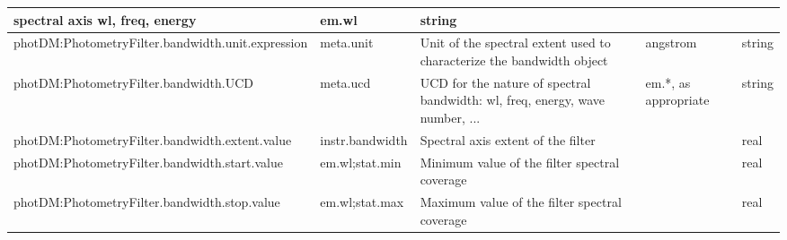 \documentclass[11pt,a4paper]{ivoa}
\begin{document}
\begin{appendices}
\begin{table}[H]
\begin{adjustbox}{angle=90}
\begin{tabular}{p{5in}p{0.87in}p{2in}p{0.4in}p{0.25in}}
{{spectral axis wl, freq, energy}} &
\multicolumn{1}{p{0.74in}}{{\fontsize{8pt}{8pt}\selectfont em.wl}} &
\multicolumn{1}{p{0.35in}}{{\fontsize{8pt}{8pt}\selectfont string}} \\
\hline
\multicolumn{1}{p{5in}}{{\fontsize{8pt}{8pt}
\selectfont photDM:PhotometryFilter.bandwidth.unit.expression}} &
\multicolumn{1}{p{0.87in}}{{\fontsize{8pt}{8pt}\selectfont meta.unit}} &
\multicolumn{1}{p{2in}}{{\fontsize{8pt}{8pt}\selectfont Unit of the spectral extent 
used to characterize the bandwidth object}} &
\multicolumn{1}{p{0.74in}}{{\fontsize{10pt}{12.0pt}\selectfont angstrom}} &
\multicolumn{1}{p{0.35in}}{{\fontsize{8pt}{8pt}\selectfont string}} \\
\hline
\multicolumn{1}{p{5in}}{
{\fontsize{8pt}{8pt}\selectfont photDM:PhotometryFilter.bandwidth.UCD}} &
\multicolumn{1}{p{0.87in}}{{\fontsize{8pt}{8pt}\selectfont meta.ucd }} &
\multicolumn{1}{p{2in}}{{\fontsize{8pt}{8pt}\selectfont UCD for the nature of 
spectral bandwidth: wl, freq, energy, wave number, ...}} &
\multicolumn{1}{p{0.74in}}{{\fontsize{8pt}{8pt}\selectfont em.*, as appropriate}} &
\multicolumn{1}{p{0.35in}}{{\fontsize{8pt}{8pt}\selectfont string}} \\
\hline
\multicolumn{1}{p{5in}}{{\fontsize{8pt}{8pt}
\selectfont photDM:PhotometryFilter.bandwidth.extent.value}} &
\multicolumn{1}{p{0.87in}}{{\fontsize{8pt}{8pt}\selectfont instr.bandwidth}} &
\multicolumn{1}{p{2in}}{{\fontsize{8pt}{8pt}\selectfont Spectral axis extent of the filter}} &
\multicolumn{1}{p{0.74in}}{} &
\multicolumn{1}{p{0.35in}}{{\fontsize{8pt}{8pt}\selectfont real}} \\
\hline
\multicolumn{1}{p{5in}}{{\fontsize{8pt}{8pt}
\selectfont photDM:PhotometryFilter.bandwidth.start.value}} &
\multicolumn{1}{p{0.87in}}{{\fontsize{8pt}{8pt}\selectfont em.wl;stat.min}} &
\multicolumn{1}{p{2in}}{{\fontsize{8pt}{8pt}\selectfont Minimum value of the filter 
spectral coverage}} &
\multicolumn{1}{p{0.74in}}{} &
\multicolumn{1}{p{0.35in}}{{\fontsize{8pt}{8pt}\selectfont real}} \\
\hline
\multicolumn{1}{p{5in}}{{\fontsize{8pt}{8pt}
\selectfont photDM:PhotometryFilter.bandwidth.stop.value}} &
\multicolumn{1}{p{0.87in}}{{\fontsize{8pt}{8pt}\selectfont em.wl;stat.max}} &
\multicolumn{1}{p{2in}}{{\fontsize{8pt}{8pt}\selectfont Maximum value of the 
filter spectral coverage}} &
\multicolumn{1}{p{0.74in}}{} &
\multicolumn{1}{p{0.35in}}{{\fontsize{8pt}{8pt}\selectfont real}} \\
\hline
\end{tabular}
\end{adjustbox}
 \end{table}



\end{appendices}
\end{document}

